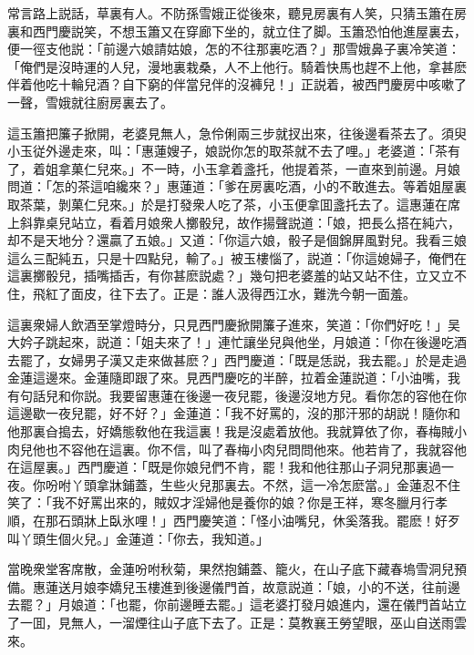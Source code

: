 常言路上説話，草裏有人。不防孫雪娥正從後來，聽見房裏有人笑，只猜玉簫在房裏和西門慶説笑，不想玉簫又在穿廊下坐的，就立住了脚。玉簫恐怕他進屋裏去，便一徑支他説：「前邊六娘請姑娘，怎的不往那裏吃酒？」那雪娥鼻子裏冷笑道：「俺們是沒時運的人兒，漫地裏栽桑，人不上他行。騎着快馬也趕不上他，拿甚麽伴着他吃十輪兒酒？自下窮的伴當兒伴的沒褲兒！」正説着，被西門慶房中咳嗽了一聲，雪娥就往廚房裏去了。

這玉簫把簾子掀開，老婆見無人，急伶俐兩三步就扠出來，往後邊看茶去了。須臾小玉従外邊走來，叫：「惠蓮嫂子，娘説你怎的取茶就不去了哩。」老婆道：「茶有了，着姐拿菓仁兒來。」不一時，小玉拿着盞托，他提着茶，一直來到前邊。月娘問道：「怎的茶這咱纔來？」惠蓮道：「爹在房裏吃酒，小的不敢進去。等着姐屋裏取茶葉，剝菓仁兒來。」於是打發衆人吃了茶，小玉便拿囬盞托去了。這惠蓮在席上斜靠桌兒站立，看着月娘衆人擲骰兒，故作揚聲説道：「娘，把長么搭在純六，却不是天地分？還贏了五娘。」又道：「你這六娘，骰子是個錦屏風對兒。我看三娘這么三配純五，只是十四點兒，輸了。」被玉樓惱了，説道：「你這媳婦子，俺們在這裏擲骰兒，插嘴插舌，有你甚麽説處？」幾句把老婆羞的站又站不住，立又立不住，飛紅了面皮，往下去了。正是：誰人汲得西江水，難洗今朝一面羞。

這裏衆婦人飲酒至掌燈時分，只見西門慶掀開簾子進來，笑道：「你們好吃！」吴大妗子跳起來，説道：「姐夫來了！」連忙讓坐兒與他坐，月娘道：「你在後邊吃酒去罷了，女婦男子漢又走來做甚麽？」西門慶道：「既是恁説，我去罷。」於是走過金蓮這邊來。金蓮隨即跟了來。見西門慶吃的半醉，拉着金蓮説道：「小油嘴，我有句話兒和你説。我要留惠蓮在後邊一夜兒罷，後邊沒地方兒。看你怎的容他在你這邊歇一夜兒罷，好不好？」金蓮道：「我不好罵的，沒的那汗邪的胡説！隨你和他那裏㒲搗去，好嬌態敎他在我這裏！我是沒處着放他。我就算依了你，春梅賊小肉兒他也不容他在這裏。你不信，叫了春梅小肉兒問問他來。他若肯了，我就容他在這屋裏。」西門慶道：「既是你娘兒們不肯，罷！我和他往那山子洞兒那裏過一夜。你吩咐丫頭拿牀鋪蓋，生些火兒那裏去。不然，這一冷怎麽當。」金蓮忍不住笑了：「我不好罵出來的，賊奴才淫婦他是養你的娘？你是王祥，寒冬臘月行孝順，在那石頭牀上臥氷哩！」西門慶笑道：「怪小油嘴兒，休奚落我。罷麽！好歹叫丫頭生個火兒。」金蓮道：「你去，我知道。」

當晚衆堂客席散，金蓮吩咐秋菊，果然抱鋪蓋、籠火，在山子底下藏春塢雪洞兒預備。惠蓮送月娘李嬌兒玉樓進到後邊儀門首，故意説道：「娘，小的不送，往前邊去罷？」月娘道：「也罷，你前邊睡去罷。」這老婆打發月娘進内，還在儀門首站立了一囬，見無人，一溜煙往山子底下去了。正是：莫教襄王勞望眼，巫山自送雨雲來。

